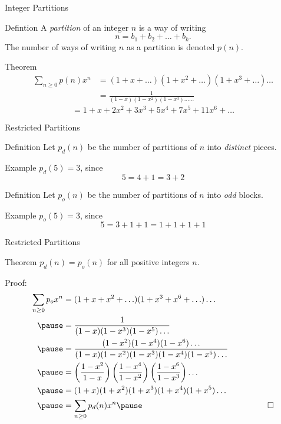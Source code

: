 \documentclass[xcolor=dvipsnames]{beamer}
\begin{document}
\begin{frame}{Integer Partitions}
  \pause
  \begin{block}{Defintion}
    A \emph{partition} of an integer $n$ is a way of writing 
    $$ n = b_1 + b_2 + \ldots + b_k.$$
    \pause
    The number of ways of writing $n$ as a partition is denoted $p(n)$.  
  \end{block}
  \pause
  \begin{block}{Theorem}
    $$\begin{aligned} 
    \sum_{n \geq 0} p(n) x^n &= 
    (1 + x + \ldots)(1 + x^2 + \ldots) (1 + x^3 + \ldots) \ldots \\
      &= \frac{1}{(1-x)(1-x^2)(1-x^3) \ldots \ldots}
      \end{aligned}$$
    \pause
    $$  = 1 + x + 2x^2 + 3x^3 + 5x^4 + 7x^5 + 11x^6 + \ldots $$
  \end{block}
\end{frame}


\begin{frame}{Restricted Partitions}
  \pause
  \begin{block}{Definition}
    Let $p_d (n)$ be the number of partitions of $n$ into \emph{distinct}
    pieces. 
  \end{block}
  \begin{block}{Example}
    $p_d (5) = 3$, since 
    $$ 5 = 4 + 1 = 3 + 2 $$
  \end{block}
  \pause
  \begin{block}{Definition}
    Let $p_o(n)$ be the number of partitions of $n$ into \emph{odd} blocks.
  \end{block}
  \begin{block}{Example}
    $p_o(5) = 3$, since
    $$5 = 3 + 1 + 1 = 1 + 1 + 1 + 1$$
  \end{block}
\end{frame}


\begin{frame}{Restricted Partitions}
  \begin{block}{Theorem}
    $p_d(n) = p_o(n)$ for all positive integers $n$. 
  \end{block}
  \pause
  \begin{block}{Proof:} \small
    $$\begin{aligned}
    \sum_{n \geq 0} p_o x^n &= (1 + x + x^2 + \ldots)(1 + x^3 + x^6 + \ldots )
    \ldots \\
      \pause
      &= \frac{1}{(1-x)(1-x^3)(1-x^5) \ldots}\\
      \pause
      &= \frac{(1-x^2)(1-x^4)(1-x^6) \ldots}{(1-x)(1-x^2)(1-x^3)(1-x^4)(1-x^5)
      \ldots} \\
      \pause
      &= \left(\frac{1-x^2}{1-x}\right) 
          \left(\frac{1-x^4}{1-x^2}\right) 
          \left(\frac{1 - x^6}{1-x^3}\right) \ldots \\
      \pause
      &= (1+x) (1+x^2) (1+x^3) (1+x^4) (1+x^5) \ldots  \\
      \pause
      &= \sum_{n \geq 0} p_d(n) x^n 
      \pause
       \hspace{11pc} \qed \end{aligned} $$
  \end{block}
\end{frame}
\end{document}
